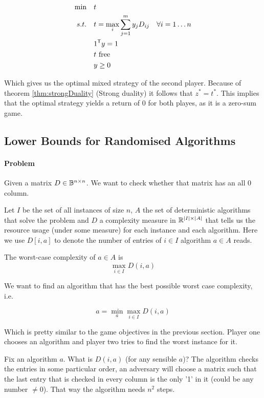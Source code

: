 \begin{pr}
\begin{align*}
\min \quad & t \\
s.t.\quad & t = \max_i \sum^m_{j=1} y_j D_{ij} & \forall i=1\ldots n\\
& {1}^\text{\upshape \sffamily T} y = 1\\
&t \text{ free}\\
&y\geq 0
\end{align*}

Which gives us the optimal mixed strategy of the second player. Because of theorem \ref{thm:strongDuality} (Strong duality) it follows that $z^{*}=t^{*}$. This implies that the optimal strategy yields a return of $0$ for both playes, as it is a zero-sum game.
\end{pr}

\subsection{Lower Bounds for Randomised Algorithms}

\paragraph{Problem} Given a matrix $D\in \mathbb{B}^{n\times n}$. We want to check whether that matrix has an all 0 column. 

Let $I$ be the set of all instances of size $n$, $A$ the set of deterministic algorithms that solve the problem and $D$ a complexity measure in $\mathbb{R}^{|I| \times |A|}$ that tells us the resource usage (under some measure) for each instance and each algorithm. Here we use $D[i,a]$ to denote the number of entries of $i\in I$ algorithm $a\in A$ reads.

\begin{Def} The worst-case complexity of $a\in A$ is 
\[\max_{i\in I} D(i,a)\]
\end{Def}

We want to find an algorithm that has the best possible worst case complexity, i.e.

\[a = \min_a \max_{i\in I} D(i,a)\]

Which is pretty similar to the game objectives in the previous section. Player one chooses an algorithm and player two tries to find the worst instance for it.

Fix an algorithm $a$. What is $D(i,a)$ (for any sensible $a$)? The algorithm checks the entries in some particular order, an adversary will choose a matrix such that the last entry that is checked in every column is the only '1' in it (could be any number $\neq 0$). That way the algorithm needs $n^2$ steps.

